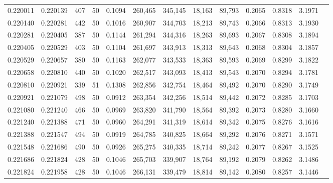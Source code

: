 \begin{tabular}{rrrrrrrrrrrrr}
0.220011 & 0.220139 &   407 &  50 &                                     0.1094 & 260,465 & 345,145 &  18,163 &  89,793 & 0.2065 & 0.8318 & 3.1971 \\
0.220140 & 0.220281 &   442 &  50 &                                     0.1016 & 260,907 & 344,703 &  18,213 &  89,743 & 0.2066 & 0.8313 & 3.1930 \\
0.220281 & 0.220405 &   387 &  50 &                                     0.1144 & 261,294 & 344,316 &  18,263 &  89,693 & 0.2067 & 0.8308 & 3.1894 \\
0.220405 & 0.220529 &   403 &  50 &                                     0.1104 & 261,697 & 343,913 &  18,313 &  89,643 & 0.2068 & 0.8304 & 3.1857 \\
0.220529 & 0.220657 &   380 &  50 &                                     0.1163 & 262,077 & 343,533 &  18,363 &  89,593 & 0.2069 & 0.8299 & 3.1822 \\
0.220658 & 0.220810 &   440 &  50 &                                     0.1020 & 262,517 & 343,093 &  18,413 &  89,543 & 0.2070 & 0.8294 & 3.1781 \\
0.220810 & 0.220921 &   339 &  51 &                                     0.1308 & 262,856 & 342,754 &  18,464 &  89,492 & 0.2070 & 0.8290 & 3.1749 \\
0.220921 & 0.221079 &   498 &  50 &                                     0.0912 & 263,354 & 342,256 &  18,514 &  89,442 & 0.2072 & 0.8285 & 3.1703 \\
0.221080 & 0.221240 &   466 &  50 &                                     0.0969 & 263,820 & 341,790 &  18,564 &  89,392 & 0.2073 & 0.8280 & 3.1660 \\
0.221240 & 0.221388 &   471 &  50 &                                     0.0960 & 264,291 & 341,319 &  18,614 &  89,342 & 0.2075 & 0.8276 & 3.1616 \\
0.221388 & 0.221547 &   494 &  50 &                                     0.0919 & 264,785 & 340,825 &  18,664 &  89,292 & 0.2076 & 0.8271 & 3.1571 \\
0.221548 & 0.221686 &   490 &  50 &                                     0.0926 & 265,275 & 340,335 &  18,714 &  89,242 & 0.2077 & 0.8267 & 3.1525 \\
0.221686 & 0.221824 &   428 &  50 &                                     0.1046 & 265,703 & 339,907 &  18,764 &  89,192 & 0.2079 & 0.8262 & 3.1486 \\
0.221824 & 0.221958 &   428 &  50 &                                     0.1046 & 266,131 & 339,479 &  18,814 &  89,142 & 0.2080 & 0.8257 & 3.1446 \\

\end{tabular}
